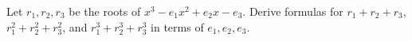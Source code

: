Let $r_1,r_2,r_3$ be the roots of $x^3-e_1x^2+e_2x-e_3$. Derive formulas for $r_1+r_2+r_3$, $r_1^2+r_2^2+r_3^2$, and $r_1^3+r_2^3+r_3^3$ in terms of $e_1,e_2,e_3$.
